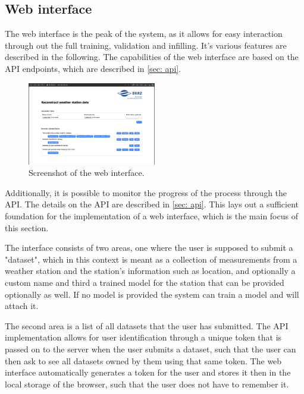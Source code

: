 \subsection{Web interface}

The web interface is the peak of the system, as it allows for easy interaction through out the full training, validation and infilling.
It's various features are described in the following. The capabilities of the web interface are based on the API endpoints, which are described in \autoref{sec: api}.

\begin{figure}
    \centering
    \includegraphics[width=0.5\textwidth]{resources/images/webinterface_screenshot.png}
    \caption{Screenshot of the web interface.}
    \label{fig: webinterface_screenshot}
    \end{figure}
Additionally, it is possible to monitor the progress of the process through the API.
The details on the API are described in \autoref{sec: api}.
This lays out a sufficient foundation for the implementation of a web interface, which is the main focus of this section.

The interface consists of two areas, one where the user is supposed to submit a "dataset", which in this context is meant as a collection of measurements from a weather station and the station's information such as location, and optionally a custom name and third a trained model for the station that can be provided optionally as well.
If no model is provided the system can train a model and will attach it.

The second area is a list of all datasets that the user has submitted.
The API implementation allows for user identification through a unique token that is passed on to the server when the user submits a dataset, such that the user can then ask to see all datasets owned by them using that same token.
The web interface automatically generates a token for the user and stores it then in the local storage of the browser, such that the user does not have to remember it.

